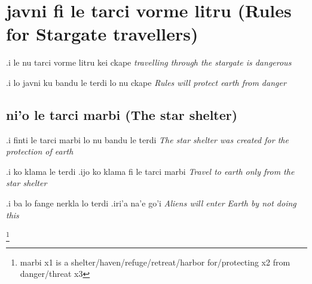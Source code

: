 \documentclass{article}
\newcommand{\para}[2]{#1 \emph{#2}}
\newcommand{\usefulWord}[2]{\footnote{#1 #2}}
\begin{document}
\section{javni fi le tarci vorme litru (Rules for Stargate travellers)}

\para{.i le nu tarci vorme litru kei ckape}{travelling through the stargate is dangerous}

\para{.i lo javni ku bandu le terdi lo nu ckape}{Rules will protect earth from danger}

\subsection{ni'o le tarci marbi (The star shelter)}

\para{.i finti le tarci marbi lo nu bandu le terdi}{The star shelter was created for the protection of earth}

\para{.i ko klama le terdi .ijo ko klama fi le tarci marbi}{Travel to earth only from the star shelter}

\para{.i ba lo fange nerkla lo terdi .iri'a na'e go'i}{Aliens will enter Earth by not doing this}



\usefulWord{marbi}{x1 is a shelter/haven/refuge/retreat/harbor for/protecting x2 from danger/threat x3}
\end{document}

